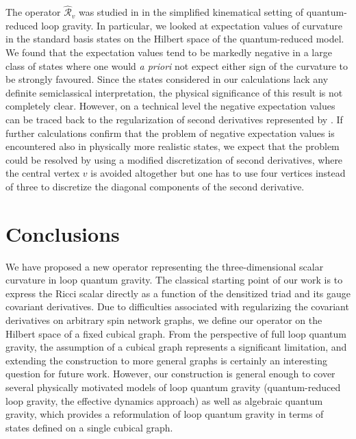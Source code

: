 \documentclass{appolb_edited}
\newcommand{\R}{{\mathscr R}}
\begin{document}
The operator $\widehat\R_v$ was studied in \cite{Lewandowski:2022xox} in the simplified kinematical setting of quantum-reduced loop gravity. In particular, we looked at expectation values of curvature in the standard basis states on the Hilbert space of the quantum-reduced model. We found that the expectation values tend to be markedly negative in a large class of states where one would {\em a priori} not expect either sign of the curvature to be strongly favoured. Since the states considered in our calculations lack any definite semiclassical interpretation, the physical significance of this result is not completely clear. However, on a technical level the negative expectation values can be traced back to the regularization of second derivatives represented by . If further calculations confirm that the problem of negative expectation values is encountered also in physically more realistic states, we expect that the problem could be resolved by using a modified discretization of second derivatives, where the central vertex $v$ is avoided altogether but one has to use four vertices instead of three to discretize the diagonal components of the second derivative.

\section{Conclusions}

We have proposed a new operator representing the three-dimensional scalar curvature in loop quantum gravity. The classical starting point of our work is to express the Ricci scalar directly as a function of the densitized triad and its gauge covariant derivatives. Due to difficulties associated with regularizing the covariant derivatives on arbitrary spin network graphs, we define our operator on the Hilbert space of a fixed cubical graph. From the perspective of full loop quantum gravity, the assumption of a cubical graph represents a significant limitation, and extending the construction to more general graphs is certainly an interesting question for future work. However, our construction is general enough to cover several physically motivated models of loop quantum gravity (quantum-reduced loop gravity, the effective dynamics approach) as well as algebraic quantum gravity, which provides a reformulation of loop quantum gravity in terms of states defined on a single cubical graph.
\end{document}
